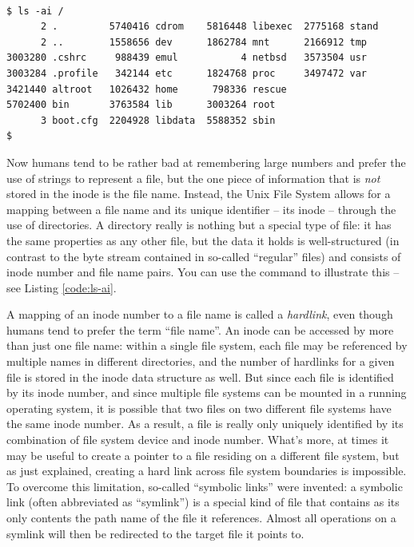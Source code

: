 \begin{lstlisting}[float,basicstyle=\scriptsize,label=code:ls-ai,caption={[Output
of {\tt ls -ai}]Use of the ls(1) command on a NetBSD
system to illustrate how file names are mapped to
inode numbers in a directory.  (Note that in the root
directory both '.' and '..' have the same inode
number\, as in this special case they actually are the
same directory.)}]

$ ls -ai /
      2 .         5740416 cdrom    5816448 libexec  2775168 stand
      2 ..        1558656 dev      1862784 mnt      2166912 tmp
3003280 .cshrc     988439 emul           4 netbsd   3573504 usr
3003284 .profile   342144 etc      1824768 proc     3497472 var
3421440 altroot   1026432 home      798336 rescue
5702400 bin       3763584 lib      3003264 root
      3 boot.cfg  2204928 libdata  5588352 sbin
$
\end{lstlisting}

Now humans tend to be rather bad at remembering large
numbers and prefer the use of strings to represent a
file, but the one piece of information that is {\em
not} stored in the inode is the file name.  Instead,
the Unix File System allows for a mapping between a
file name and its unique identifier -- its inode --
through the use of directories.  A directory really is
nothing but a special type of file: it has the same
properties as any other file, but the data it holds is
well-structured (in contrast to the byte stream
contained in so-called ``regular'' files) and consists
of inode number and file name pairs.  You can use the
 command to illustrate this --
see Listing \ref{code:ls-ai}.

A mapping of an inode number to a file name is called
a {\em hardlink}, even though humans
tend to prefer the term ``file name''. An inode can be
accessed by more than just one file name: within a
single file system, each file may be referenced by
multiple names in different directories, and the
number of hardlinks for a given file is stored in the
inode data structure as well.  But since each file is
identified by its inode number, and since multiple
file systems can be mounted in a running operating
system, it is possible that two files on two different
file systems have the same inode number.  As a result,
a file is really only uniquely identified by its
combination of file system device and inode number.
What's more, at times it may be useful to create a
pointer to a file residing on a different file system,
but as just explained, creating a hard link across
file system boundaries is impossible.  To overcome
this limitation, so-called ``symbolic
links'' were invented: a symbolic
link (often abbreviated as ``symlink'') is a special
kind of file that contains as its only contents the
path name of the file it references.  Almost all
operations on a symlink will then be redirected to the
target file it points to.

